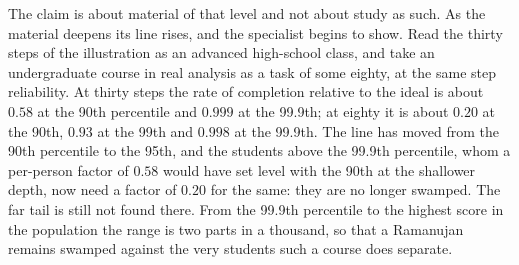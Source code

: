 \documentclass{article}
\begin{document}
The claim is about material of that level and not about study as such. As the material deepens its line rises, and the specialist begins to show. Read the thirty steps of the illustration as an advanced high-school class, and take an undergraduate course in real analysis as a task of some eighty, at the same step reliability. At thirty steps the rate of completion relative to the ideal is about $0.58$ at the 90th percentile and $0.999$ at the 99.9th; at eighty it is about $0.20$ at the 90th, $0.93$ at the 99th and $0.998$ at the 99.9th. The line has moved from the 90th percentile to the 95th, and the students above the 99.9th percentile, whom a per-person factor of $0.58$ would have set level with the 90th at the shallower depth, now need a factor of $0.20$ for the same: they are no longer swamped. The far tail is still not found there. From the 99.9th percentile to the highest score in the population the range is two parts in a thousand, so that a Ramanujan remains swamped against the very students such a course does separate.
\end{document}
